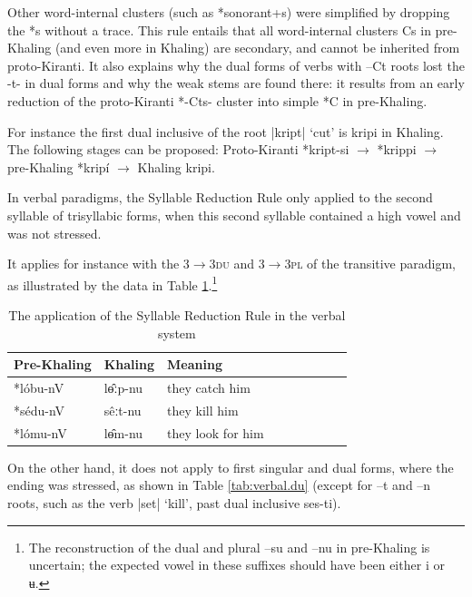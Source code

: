 \documentclass[oldfontcommands,oneside,a4paper,11pt]{article}
\newcommand{\ipa}[1]{{\phon \mbox{#1}}} %
\begin{document}
Other word-internal clusters (such as *sonorant+s) were simplified by dropping the \ipa{*s} without a trace. This rule entails that all word-internal clusters Cs in pre-Khaling (and even more in Khaling) are secondary, and cannot be inherited from proto-Kiranti. It also explains why the dual forms of verbs with \ipa{--Ct} roots lost the -t- in dual forms and why the weak stems are found there: it results from an early reduction of the proto-Kiranti *-Cts- cluster into simple *C in pre-Khaling. 

For instance the first dual inclusive of the root |\ipa{kript}| `cut' is \ipa{kripi} in Khaling. The following stages can be proposed: Proto-Kiranti \ipa{*kript-si} $\rightarrow$ \ipa{*krippi} $\rightarrow$ pre-Khaling \ipa{*kripí}  $\rightarrow$ Khaling \ipa{kripi}.


In  verbal paradigms, the Syllable Reduction Rule only applied to the second syllable of trisyllabic forms, when this second syllable contained a high vowel and was not stressed. 

It applies for instance with the \textsc{3$\rightarrow$3du} and \textsc{3$\rightarrow$3pl} of the transitive paradigm, as illustrated by the data in Table \ref{tab:verbal.drr}.\footnote{The reconstruction of the dual and plural \ipa{--su} and \ipa{--nu} in pre-Khaling is uncertain; the expected vowel in these suffixes should have been either \ipa{i} or \ipa{ʉ}. } 

\begin{table}[h] 
\caption{The application of the  Syllable Reduction Rule in the verbal system} \centering  \label{tab:verbal.drr} 
\begin{tabular}{lllllllll} 
\toprule 
Pre-Khaling	&Khaling &Meaning\\
\midrule
\ipa{*lóbu-nV}  & \ipa{lɵ̂ːp-nu} & they catch him \\ 
\ipa{*sédu-nV} & \ipa{sêːt-nu} & they kill him \\ 
\ipa{*lómu-nV}  & \ipa{lɵ̂m-nu} & they look for him \\
\bottomrule
\end{tabular}
\end{table}

On the other hand, it does not apply to first singular and dual forms, where the ending was stressed, as shown in Table \ref{tab:verbal.du} (except for \ipa{--t} and \ipa{--n} roots, such as the verb |\ipa{set}| `kill', past dual inclusive \ipa{ses-ti}).
\end{document}

